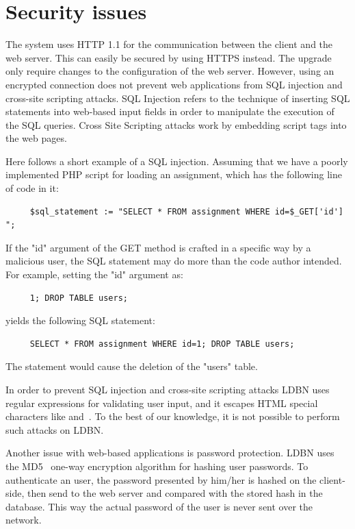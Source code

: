 \section{Security issues}
The system uses HTTP 1.1 for the communication between the client and the web
server. This can easily be secured by using HTTPS instead. The upgrade only
require changes to the configuration of the web server. However, using an encrypted
connection does not prevent web applications from SQL injection and cross-site 
scripting attacks. SQL Injection refers to the technique of 
inserting SQL statements into web-based input fields in 
order to manipulate the execution of the SQL queries. Cross Site Scripting 
attacks work by embedding script tags into the web pages. 

Here follows a short example of a SQL injection.
Assuming that we have a poorly implemented PHP script for loading an assignment,
which has the following line of code in it:

\begin{verbatim}
     $sql_statement := "SELECT * FROM assignment WHERE id=$_GET['id'] ";
\end{verbatim}

\noindent If the "id" argument of the GET method is crafted in a specific way by a 
malicious user, the SQL statement may do more than the code author intended. 
For example, setting the "id" argument as:

\begin{verbatim}
     1; DROP TABLE users;
\end{verbatim}

\noindent yields the following SQL statement:

\begin{verbatim}
     SELECT * FROM assignment WHERE id=1; DROP TABLE users;
\end{verbatim}

\noindent The statement would cause the deletion of the "users" table. 

In order to prevent SQL injection and cross-site 
scripting attacks LDBN uses regular expressions for validating
user input, and it escapes HTML special characters like \lt and~\gt.
To the best of our knowledge, it is not possible to perform such attacks on LDBN.

Another issue with web-based applications is password protection. LDBN uses the 
MD5~\cite{w7} one-way encryption algorithm for hashing user passwords. 
To authenticate an user, the password presented by him/her is hashed on the client-side, 
then send to the web server and compared with the stored hash in the database. 
This way the actual password of the user is never sent over the network.
